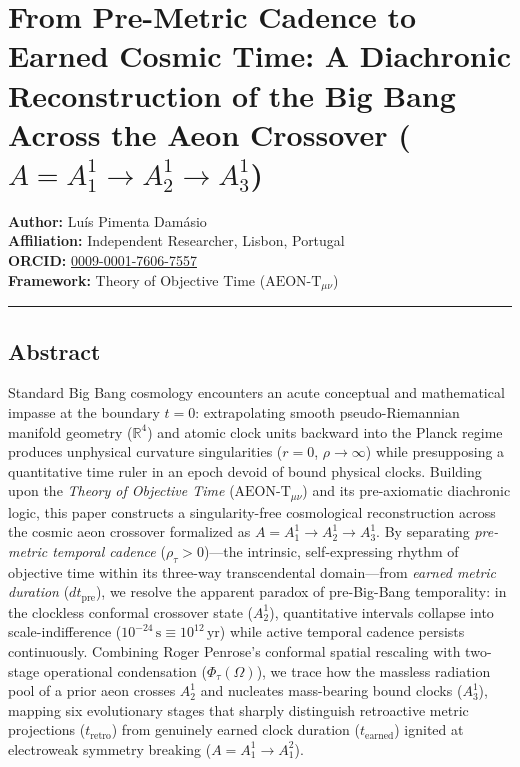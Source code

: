 \documentclass[
]{article}
\author{}
\date{}
\begin{document}
\section{\texorpdfstring{From Pre-Metric Cadence to Earned Cosmic Time:
A Diachronic Reconstruction of the Big Bang Across the Aeon Crossover
(\(A = A_1^1 \to A_2^1 \to A_3^1\))}{From Pre-Metric Cadence to Earned Cosmic Time: A Diachronic Reconstruction of the Big Bang Across the Aeon Crossover (A = A\_1\^{}1 \textbackslash to A\_2\^{}1 \textbackslash to A\_3\^{}1)}}\label{from-pre-metric-cadence-to-earned-cosmic-time-a-diachronic-reconstruction-of-the-big-bang-across-the-aeon-crossover-a-a_11-to-a_21-to-a_31}

\textbf{Author:} Luís Pimenta Damásio\\
\textbf{Affiliation:} Independent Researcher, Lisbon, Portugal\\
\textbf{ORCID:}
\href{https://orcid.org/0009-0001-7606-7557}{0009-0001-7606-7557}\\
\textbf{Framework:} Theory of Objective Time
(\(\text{AEON-T}_{\mu\nu}\))

\begin{center}\rule{0.5\linewidth}{0.5pt}\end{center}

\subsection{Abstract}\label{abstract}

Standard Big Bang cosmology encounters an acute conceptual and
mathematical impasse at the boundary \(t = 0\): extrapolating smooth
pseudo-Riemannian manifold geometry (\(\mathbb{R}^4\)) and atomic clock
units backward into the Planck regime produces unphysical curvature
singularities (\(r = 0\), \(\rho \to \infty\)) while presupposing a
quantitative time ruler in an epoch devoid of bound physical clocks.
Building upon the \emph{Theory of Objective Time}
(\(\text{AEON-T}_{\mu\nu}\)) and its pre-axiomatic diachronic logic,
this paper constructs a singularity-free cosmological reconstruction
across the cosmic aeon crossover formalized as
\(A = A_1^1 \to A_2^1 \to A_3^1\). By separating \emph{pre-metric
temporal cadence} (\(\rho_\tau > 0\))---the intrinsic, self-expressing
rhythm of objective time within its three-way transcendental
domain---from \emph{earned metric duration} (\(dt_{\mathrm{pre}}\)), we
resolve the apparent paradox of pre-Big-Bang temporality: in the
clockless conformal crossover state (\(A_2^1\)), quantitative intervals
collapse into scale-indifference
(\(10^{-24}\,\mathrm{s} \equiv 10^{12}\,\mathrm{yr}\)) while active
temporal cadence persists continuously. Combining Roger Penrose's
conformal spatial rescaling with two-stage operational condensation
(\(\Phi_\tau(\Omega)\)), we trace how the massless radiation pool of a
prior aeon crosses \(A_2^1\) and nucleates mass-bearing bound clocks
(\(A_3^1\)), mapping six evolutionary stages that sharply distinguish
retroactive metric projections (\(t_{\mathrm{retro}}\)) from genuinely
earned clock duration (\(t_{\mathrm{earned}}\)) ignited at electroweak
symmetry breaking (\(A = A_1^1 \to A_1^2\)).
\end{document}
